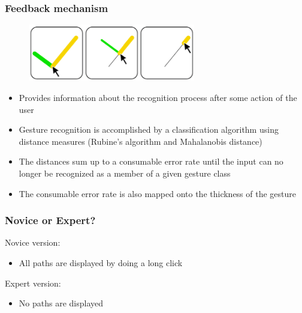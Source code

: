 \documentclass{beamer}
\begin{document}

\begin{frame}
\frametitle{Feedback mechanism}

\begin{figure}[H]
\centering
\includegraphics[width=0.65\textwidth]{fb.png}
\end{figure}

\begin{itemize}
\item Provides information about the recognition process after some action of the user 
\pause
\item Gesture recognition is accomplished by a classification algorithm using distance measures (Rubine's algorithm and Mahalanobis distance) 
\pause
\item The distances sum up to a consumable error rate until the input can no longer be recognized as a member of a given gesture class
\pause
\item The consumable error rate is also mapped onto the thickness of the gesture

\end{itemize}



\end{frame}


\begin{frame}
\frametitle{Novice or Expert?}

Novice version: 
\begin{itemize}
\item All paths are displayed by doing a long click \newline
\end{itemize}
\pause

Expert version: 
\begin{itemize}
\item No paths are displayed
\end{itemize}

\end{frame}
\end{document}
